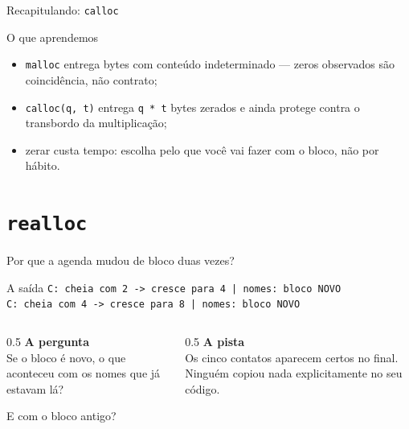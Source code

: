 \documentclass[aspectratio=169]{beamer}
\begin{document}
\begin{frame}{Recapitulando: \texttt{calloc}}
  \begin{block}{O que aprendemos}
    \begin{itemize}
      \item \texttt{malloc} entrega bytes com conteúdo indeterminado --- zeros
        observados são coincidência, não contrato;
      \item \texttt{calloc(q, t)} entrega \texttt{q * t} bytes zerados e ainda
        protege contra o transbordo da multiplicação;
      \item zerar custa tempo: escolha pelo que você vai fazer com o bloco, não
        por hábito.
    \end{itemize}
  \end{block}
\end{frame}

\section{\texttt{realloc}}

\begin{frame}{Por que a agenda mudou de bloco duas vezes?}
  \begin{block}{A saída}
    \texttt{C: cheia com 2 -> cresce para 4 | nomes: bloco NOVO}\\
    \texttt{C: cheia com 4 -> cresce para 8 | nomes: bloco NOVO}
  \end{block}
  \begin{columns}[T]
    \begin{column}{0.5\textwidth}
      \textbf{A pergunta}\\[0.3em]
      Se o bloco é novo, o que aconteceu com os nomes que já estavam lá?

      E com o bloco antigo?
    \end{column}
    \begin{column}{0.5\textwidth}
      \textbf{A pista}\\[0.3em]
      Os cinco contatos aparecem certos no final. Ninguém copiou nada
      explicitamente no seu código.
    \end{column}
  \end{columns}
\end{frame}
\end{document}
